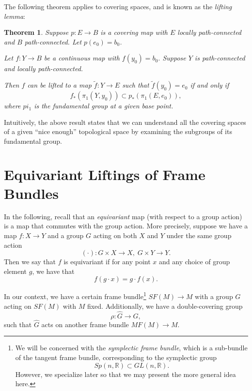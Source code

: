\documentclass{tufte-handout}
\newtheorem{thrm}{Theorem} %
\begin{document}
The following theorem applies to covering spaces, and is known as the \emph{lifting lemma}:
\begin{fullwidth}
\begin{thrm}
Suppose $p: E \to B$ is a covering map with $E$ locally path-connected and $B$ path-connected. Let $p(e_0) = b_0$.

Let $f: Y \to B$ be a continuous map with $f(y_0) = b_0$. Suppose $Y$ is path-connected and locally path-connected.

Then $f$ can be lifted to a map $\widetilde{f}: Y \to E$ such that $\widetilde{f}(y_0) = e_0$ if and only if
$$
f_{*}(\pi_1(Y,y_0)) \subset p_{*}(\pi_1(E,e_0)),
$$
where $pi_1$ is the fundamental group at a given base point.

\end{thrm}
\end{fullwidth}
Intuitively, the above result states that we can understand all the covering spaces of a given ``nice enough'' topological space by examining the subgroups of its fundamental group.

\section{Equivariant Liftings of Frame Bundles}
In the following, recall that an \emph{equivariant} map (with respect to a group action) is a map that commutes with the group action. More precisely, suppose we have a map $f: X \to Y$ and a group $G$ acting on both $X$ and $Y$ under the same group action
$$
(\cdot): G \times X \to X, \; G \times Y \to Y.
$$
Then we say that $f$ is equivariant if for any point $x$ and any choice of group element $g$, we have that
$$
f(g\cdot x) = g\cdot f(x).
$$

In our context, we have a certain frame bundle\footnote{We will be concerned with the \emph{symplectic frame bundle}, which is a sub-bundle of the tangent frame bundle, corresponding to the symplectic group
$$
Sp(n,\mathbb{R}) \subset GL(n,\mathbb{R}).
$$
However, we specialize later so that we may present the more general idea here.} $SF(M) \to M$ with a group $G$ acting on $SF(M)$ with $M$ fixed.
Additionally, we have a double-covering group
$$
\rho: \hat{G} \to G,
$$
such that $\hat{G}$ acts on another frame bundle $MF(M) \to M$.
\end{document}
